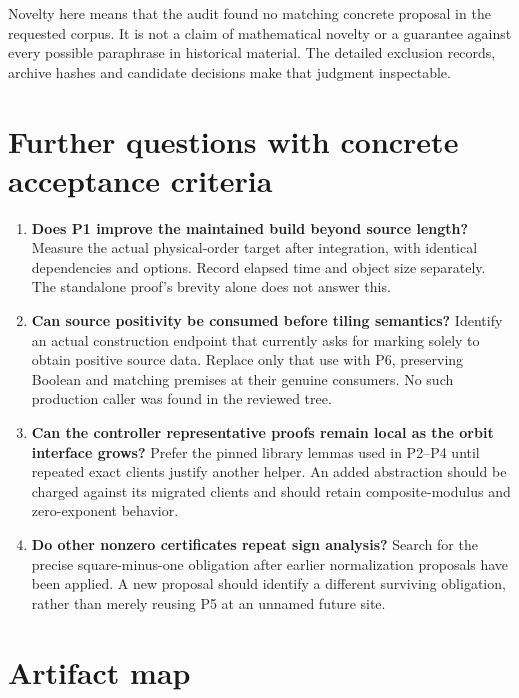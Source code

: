 \documentclass[11pt]{article}
\begin{document}
Novelty here means that the audit found no matching concrete proposal in the requested corpus. It is not a claim of mathematical novelty or a guarantee against every possible paraphrase in historical material. The detailed exclusion records, archive hashes and candidate decisions make that judgment inspectable.

\section{Further questions with concrete acceptance criteria}

\begin{enumerate}
\item \textbf{Does P1 improve the maintained build beyond source length?} Measure the actual physical-order target after integration, with identical dependencies and options. Record elapsed time and object size separately. The standalone proof's brevity alone does not answer this.
\item \textbf{Can source positivity be consumed before tiling semantics?} Identify an actual construction endpoint that currently asks for marking solely to obtain positive source data. Replace only that use with P6, preserving Boolean and matching premises at their genuine consumers. No such production caller was found in the reviewed tree.
\item \textbf{Can the controller representative proofs remain local as the orbit interface grows?} Prefer the pinned library lemmas used in P2--P4 until repeated exact clients justify another helper. An added abstraction should be charged against its migrated clients and should retain composite-modulus and zero-exponent behavior.
\item \textbf{Do other nonzero certificates repeat sign analysis?} Search for the precise square-minus-one obligation after earlier normalization proposals have been applied. A new proposal should identify a different surviving obligation, rather than merely reusing P5 at an unnamed future site.
\end{enumerate}

\section*{Artifact map}
\end{document}
